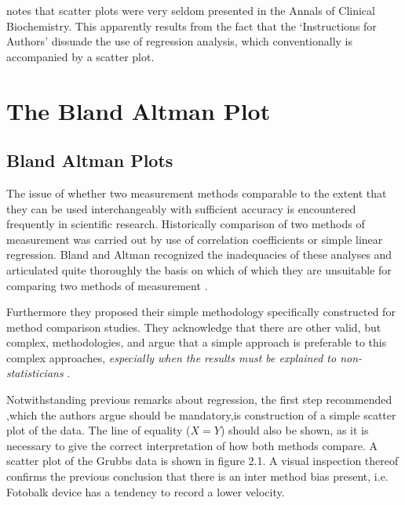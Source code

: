 \documentclass[Main.tex]{subfiles}
\begin{document}
\citet{Dewitte} notes that scatter plots were very seldom presented in the Annals of Clinical Biochemistry. This apparently results from the fact that the `Instructions for Authors' dissuade the use of regression analysis, which conventionally is accompanied by a scatter plot.
	


	
	
	\chapter{The Bland Altman Plot}

	\section{Bland Altman Plots}
	The issue of whether two measurement methods comparable to the
	extent that they can be used interchangeably with sufficient
	accuracy is encountered frequently in scientific research.
	Historically comparison of two methods of measurement was carried
	out by use of correlation coefficients or simple linear
	regression. Bland and Altman recognized the inadequacies of these
	analyses and articulated quite thoroughly the basis on which of
	which they are unsuitable for comparing two methods of measurement
	\citep*{BA83}.
	
	
	Furthermore they proposed their simple methodology specifically
	constructed for method comparison studies. They acknowledge that
	there are other valid, but complex, methodologies, and argue that
	a simple approach is preferable to this complex approaches,
	\emph{especially when the results must be explained to
		non-statisticians} \citep*{BA83}.
	
	\smallskip
	
	Notwithstanding previous remarks about regression, the first step
	recommended ,which the authors argue should be mandatory,is
	construction of a simple scatter plot of the data. The line of
	equality ($X=Y$) should also be shown, as it is necessary to give
	the correct interpretation of how both methods compare. A scatter
	plot of the Grubbs data is shown in figure 2.1. A visual
	inspection thereof confirms the previous conclusion that there is
	an inter method bias present, i.e. Fotobalk device has a tendency
	to record a lower velocity.
	
\end{document}
